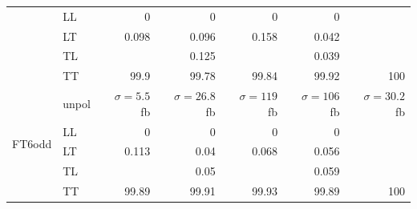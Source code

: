 \begin{table}[h]
{\begin{tabular}{llrrrrr}
 & LL & \num{0} & \num{0} & \num{0} & \num{0} &  \\
 & LT & \num{0.098} & \num{0.096} & \num{0.158} & \num{0.042} &  \\
 & TL &  & \num{0.125} &  & \num{0.039} &  \\
 & TT & \num{99.9} & \num{99.78} & \num{99.84} & \num{99.92} & \num{100} \\
\midrule
\multirow{5}{*}{FT6odd}
 & unpol & $\sigma = \num{5.5}$ fb & $\sigma = \num{26.8}$ fb & $\sigma = \num{119}$ fb & $\sigma = \num{106}$ fb & $\sigma = \num{30.2}$ fb \\
 & LL & \num{0} & \num{0} & \num{0} & \num{0} &  \\
 & LT & \num{0.113} & \num{0.04} & \num{0.068} & \num{0.056} &  \\
 & TL &  & \num{0.05} &  & \num{0.059} &  \\
 & TT & \num{99.89} & \num{99.91} & \num{99.93} & \num{99.89} & \num{100} \\
\bottomrule
\end{tabular}
}%
\end{table}